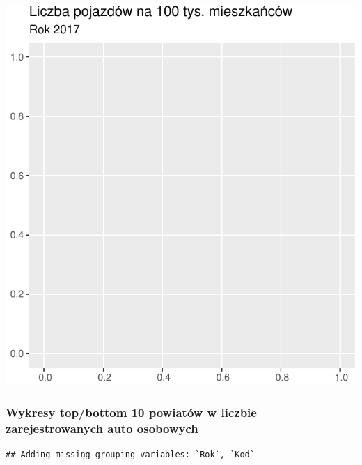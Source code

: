 \documentclass[
]{article}
\begin{document}
\begin{flushleft}\includegraphics{raport_wypadki_files/figure-latex/unnamed-chunk-35-1} \end{flushleft}

\hypertarget{wykresy-topbottom-10-powiatuxf3w-w-liczbie-zarejestrowanych-auto-osobowych}{%
\subsubsection{Wykresy top/bottom 10 powiatów w liczbie zarejestrowanych
auto
osobowych}\label{wykresy-topbottom-10-powiatuxf3w-w-liczbie-zarejestrowanych-auto-osobowych}}

\begin{verbatim}
## Adding missing grouping variables: `Rok`, `Kod`
\end{verbatim}
\end{document}
